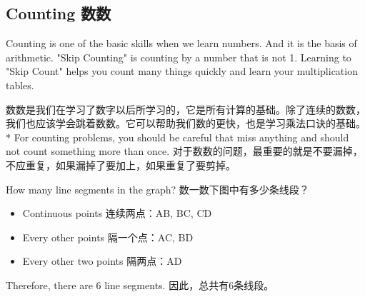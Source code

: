 \subsection{Counting 数数}
\begin{paracol}{2}
Counting is one of the basic skills when we learn numbers. And it is the basis of arithmetic. "Skip Counting" is counting by a number that is not 1. Learning to "Skip Count" helps you count many things quickly and learn your multiplication tables. 
 
\switchcolumn[1]
数数是我们在学习了数字以后所学习的，它是所有计算的基础。除了连续的数数，我们也应该学会跳着数数。它可以帮助我们数的更快，也是学习乘法口诀的基础。
\switchcolumn[0]*
For counting problems, you should be careful that miss anything and should not count something more than once. 
\switchcolumn[1]
对于数数的问题，最重要的就是不要漏掉，不应重复，如果漏掉了要加上，如果重复了要剪掉。
\end{paracol}

\begin{example}
How many line segments in the graph? 数一数下图中有多少条线段？
\begin{center}
\end{center}
\end{example}
\begin{solution}
\begin{itemize}
\item Continuous points 连续两点：AB, BC, CD
\item Every other points 隔一个点：AC, BD
\item Every other two points 隔两点：AD
\end{itemize}
Therefore, there are 6 line segments. 因此，总共有6条线段。
\end{solution}

